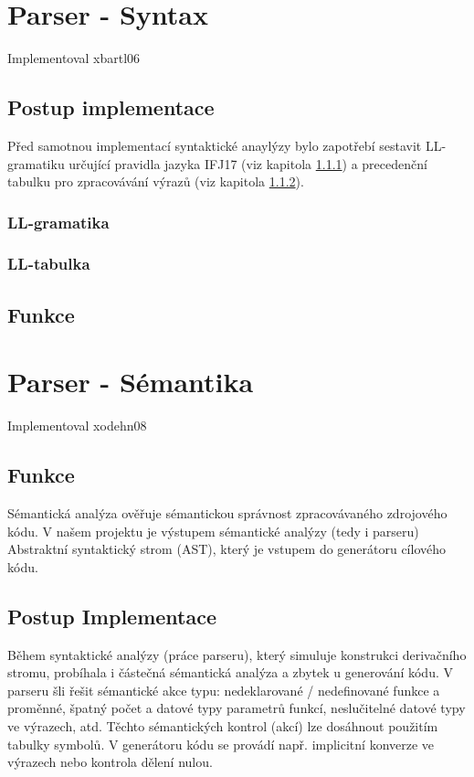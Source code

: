 \documentclass[11pt,a4paper]{article}
\begin{document}
\section{Parser - Syntax}
    Implementoval xbartl06

    \subsection{Postup implementace}
    Před samotnou implementací syntaktické anaylýzy bylo zapotřebí sestavit LL-gramatiku určující pravidla jazyka IFJ17 (viz kapitola \ref{LL_Gramatika}) a precedenční tabulku pro zpracovávání výrazů (viz kapitola \ref{LL_Tabulka}).

    


    \subsubsection{LL-gramatika} \label{LL_Gramatika}

    \subsubsection{LL-tabulka} \label{LL_Tabulka}

    \subsection{Funkce}


    \newpage



\section{Parser - Sémantika}
    Implementoval xodehn08

    \subsection{Funkce}
    Sémantická analýza ověřuje sémantickou správnost zpracovávaného zdrojového kódu. V našem projektu je výstupem sémantické analýzy (tedy i parseru) Abstraktní syntaktický strom (AST), který je vstupem do generátoru cílového kódu. 

    \subsection{Postup Implementace}
    Během syntaktické analýzy (práce parseru), který simuluje konstrukci derivačního stromu, probíhala i částečná sémantická analýza a zbytek u generování kódu. V parseru šli řešit sémantické akce typu: nedeklarované / nedefinované funkce a proměnné, špatný počet a datové typy parametrů funkcí, neslučitelné datové typy ve výrazech, atd. Těchto sémantických kontrol (akcí) lze dosáhnout použitím tabulky symbolů. V generátoru kódu se provádí např. implicitní konverze ve výrazech nebo kontrola dělení nulou.
    
\end{document}
